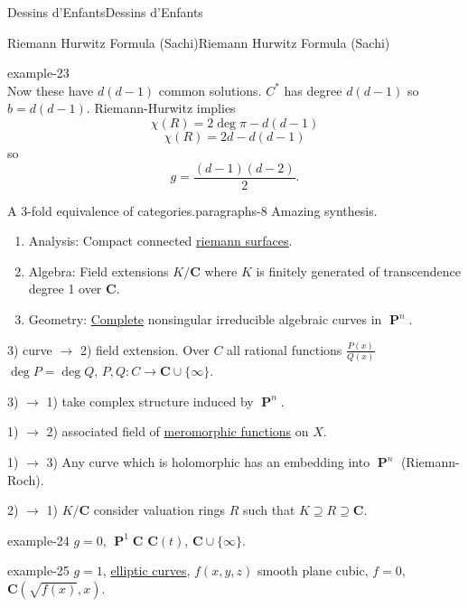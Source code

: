 \documentclass[10pt,]{book}
\numberwithin{equation}{section}
\newcommand{\CC}{\mathbf{C}}
\DeclareMathOperator{\PP}{\mathbf{P}}
\begin{document}
\begin{chapterptx}{Dessins d'Enfants}{}{Dessins d'Enfants}{}{}
\begin{sectionptx}{Riemann Hurwitz Formula (Sachi)}{}{Riemann Hurwitz Formula (Sachi)}{}{}
\begin{example}{}{example-23}
\begin{equation*}
\end{equation*}
Now these have \(d(d-1)\) common solutions. \(C^*\) has degree \(d(d-1)\) so \(b = d(d-1)\). Riemann-Hurwitz implies%
\begin{equation*}
\chi(R) = 2\deg \pi - d(d-1)
\end{equation*}
%
\begin{equation*}
\chi(R) = 2d - d(d-1)
\end{equation*}
so%
\begin{equation*}
g=  \frac{(d-1)(d-2)}{2}\text{.}
\end{equation*}
%
\end{example}
\begin{paragraphs}{A 3-fold equivalence of categories.}{paragraphs-8}%
\hypertarget{p-523}{}%
Amazing synthesis.\leavevmode%
\begin{enumerate}
\item\hypertarget{li-103}{}Analysis: Compact connected \hyperref[def-top-riem-surface]{riemann surfaces}.%
\item\hypertarget{li-104}{}Algebra: Field extensions \(K/\CC\) where \(K\) is finitely generated of transcendence degree 1 over \(\CC\).%
\item\hypertarget{li-105}{}Geometry: \hyperref[def-abelian-complete-var]{Complete} nonsingular irreducible algebraic curves in \(\PP^n\).%
\end{enumerate}
%
\par
\hypertarget{p-524}{}%
3) curve \(\to\) 2) field extension. Over \(C\) all rational functions \(\frac{P(x)}{Q(x)}\) \(\deg P= \deg Q\), \(P,Q \colon C\to \CC \cup \{\infty\}\).%
\par
\hypertarget{p-525}{}%
3) \(\to\) 1) take complex structure induced by \(\PP^n\).%
\par
\hypertarget{p-526}{}%
1) \(\to\) 2) associated field of \hyperref[def-morph-riem-surf]{meromorphic functions} on \(X\).%
\par
\hypertarget{p-527}{}%
1) \(\to\) 3) Any curve which is holomorphic has an embedding into \(\PP^n\) (Riemann-Roch).%
\par
\hypertarget{p-528}{}%
2) \(\to\) 1) \(K/\CC\) consider valuation rings \(R\) such that \(K\supseteq R\supseteq \CC\).%
\begin{example}{}{example-24}%
\hypertarget{p-529}{}%
\(g =0\), \(\PP^1 \CC\) \(\CC(t)\), \(\CC\cup \{\infty\}\).%
\end{example}
\begin{example}{}{example-25}%
\hypertarget{p-530}{}%
\(g =1\), \hyperref[def-supersing-isog-ec]{elliptic curves}, \(f(x,y,z)\) smooth plane cubic, \(f= 0\), \(\CC(\sqrt{f(x)}, x)\).%

\end{example}
\end{paragraphs}
\end{sectionptx}
\end{chapterptx}
\end{document}
